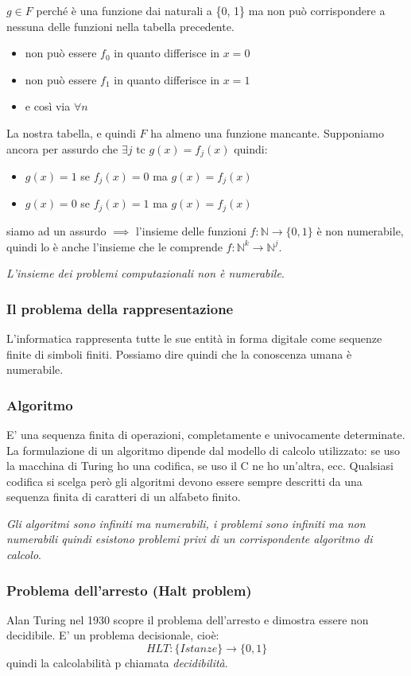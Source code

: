 $g \in F$ perché è una funzione dai naturali a \{0, 1\} ma non può corrispondere a nessuna delle funzioni nella tabella precedente.
\begin{itemize}
    \item non può essere $f_0$ in quanto differisce in $x = 0$
    \item non può essere $f_1$ in quanto differisce in $x = 1$
    \item e così via $\forall n$
\end{itemize}
La nostra tabella, e quindi $F$ ha almeno una funzione mancante. Supponiamo ancora per assurdo che $\exists j \text{ tc } g(x) = f_{j}(x)$ quindi:
\begin{itemize}
    \item $g(x) = 1$ se $f_j(x) = 0$ ma $g(x)=f_j(x)$ 
    \item $g(x) = 0$ se $f_j(x) = 1$ ma $g(x)=f_j(x)$ 
\end{itemize}
siamo ad un assurdo $\implies$ l'insieme delle funzioni $f: \mathbb{N} \longrightarrow \{0, 1\}$ è non numerabile, quindi lo è anche l'insieme che le comprende $f:\mathbb{N}^{k} \longrightarrow \mathbb{N}^{j}$.

\emph{L'insieme dei problemi computazionali non è numerabile}.

\subsubsection{Il problema della rappresentazione}
L'informatica rappresenta tutte le sue entità in forma digitale come sequenze finite di simboli finiti. Possiamo dire quindi che la conoscenza umana è numerabile.

\subsubsection{Algoritmo}
E' una sequenza finita di operazioni, completamente e univocamente determinate. La formulazione di un algoritmo dipende dal modello di calcolo utilizzato: se uso la macchina di Turing ho una codifica, se uso il C ne ho un'altra, ecc. Qualsiasi codifica si scelga però gli algoritmi devono essere sempre descritti da una sequenza finita di caratteri di un alfabeto finito.

\emph{Gli algoritmi sono infiniti ma numerabili, i problemi sono infiniti ma non numerabili quindi esistono problemi privi di un corrispondente algoritmo di calcolo}.

\subsubsection{Problema dell'arresto (Halt problem)}
Alan Turing nel 1930 scopre il problema dell'arresto e dimostra essere non decidibile. E' un problema decisionale, cioè:
$$ HLT:\{Istanze\} \longrightarrow \{0, 1\} $$
quindi la calcolabilità p chiamata \emph{decidibilità}.

